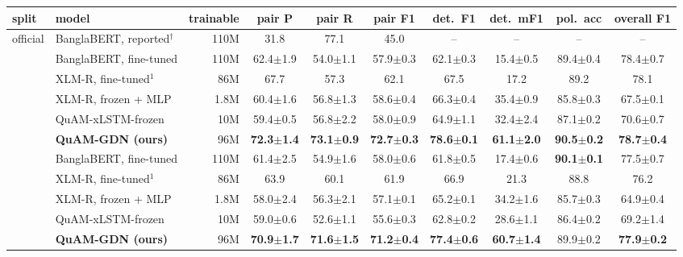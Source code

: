 \documentclass[11pt]{article}
\newcommand{\pmstd}[2]{#1{\scriptsize$\pm$#2}}
\newcommand{\quam}{QuAM-GDN}
\begin{document}
\begin{table}[p]
\centering\footnotesize
\setlength{\tabcolsep}{3.2pt}
\begin{tabular}{llrccccccc}
\toprule
split & model & trainable & pair P & pair R & \textbf{pair F1} & det.\ F1 & det.\ mF1 & pol.\ acc & overall F1 \\
\midrule
\multirow{7}{*}{official}
 & BanglaBERT, reported$^\dagger$       & 110M & 31.8 & 77.1 & 45.0 & -- & -- & -- & -- \\
 & BanglaBERT, fine-tuned               & 110M & \pmstd{62.4}{1.9} & \pmstd{54.0}{1.1} & \pmstd{57.9}{0.3} & \pmstd{62.1}{0.3} & \pmstd{15.4}{0.5} & \pmstd{89.4}{0.4} & \pmstd{78.4}{0.7} \\
 & XLM-R, fine-tuned$^1$                & 86M  & 67.7 & 57.3 & 62.1 & 67.5 & 17.2 & 89.2 & 78.1 \\
 & XLM-R, frozen + MLP                  & 1.8M & \pmstd{60.4}{1.6} & \pmstd{56.8}{1.3} & \pmstd{58.6}{0.4} & \pmstd{66.3}{0.4} & \pmstd{35.4}{0.9} & \pmstd{85.8}{0.3} & \pmstd{67.5}{0.1} \\
 & QuAM-xLSTM-frozen                    & 10M  & \pmstd{59.4}{0.5} & \pmstd{56.8}{2.2} & \pmstd{58.0}{0.9} & \pmstd{64.9}{1.1} & \pmstd{32.4}{2.4} & \pmstd{87.1}{0.2} & \pmstd{70.6}{0.7} \\
 & \textbf{\quam{} (ours)}              & 96M  & \textbf{\pmstd{72.3}{1.4}} & \textbf{\pmstd{73.1}{0.9}} & \textbf{\pmstd{72.7}{0.3}} & \textbf{\pmstd{78.6}{0.1}} & \textbf{\pmstd{61.1}{2.0}} & \textbf{\pmstd{90.5}{0.2}} & \textbf{\pmstd{78.7}{0.4}} \\
\midrule
\multirow{5}{*}{grouped}
 & BanglaBERT, fine-tuned               & 110M & \pmstd{61.4}{2.5} & \pmstd{54.9}{1.6} & \pmstd{58.0}{0.6} & \pmstd{61.8}{0.5} & \pmstd{17.4}{0.6} & \textbf{\pmstd{90.1}{0.1}} & \pmstd{77.5}{0.7} \\
 & XLM-R, fine-tuned$^1$                & 86M  & 63.9 & 60.1 & 61.9 & 66.9 & 21.3 & 88.8 & 76.2 \\
 & XLM-R, frozen + MLP                  & 1.8M & \pmstd{58.0}{2.4} & \pmstd{56.3}{2.1} & \pmstd{57.1}{0.1} & \pmstd{65.2}{0.1} & \pmstd{34.2}{1.6} & \pmstd{85.7}{0.3} & \pmstd{64.9}{0.4} \\
 & QuAM-xLSTM-frozen                    & 10M  & \pmstd{59.0}{0.6} & \pmstd{52.6}{1.1} & \pmstd{55.6}{0.3} & \pmstd{62.8}{0.2} & \pmstd{28.6}{1.1} & \pmstd{86.4}{0.2} & \pmstd{69.2}{1.4} \\
 & \textbf{\quam{} (ours)}              & 96M  & \textbf{\pmstd{70.9}{1.7}} & \textbf{\pmstd{71.6}{1.5}} & \textbf{\pmstd{71.2}{0.4}} & \textbf{\pmstd{77.4}{0.6}} & \textbf{\pmstd{60.7}{1.4}} & \pmstd{89.9}{0.2} & \textbf{\pmstd{77.9}{0.2}} \\

\end{tabular}
\end{table}
\end{document}
